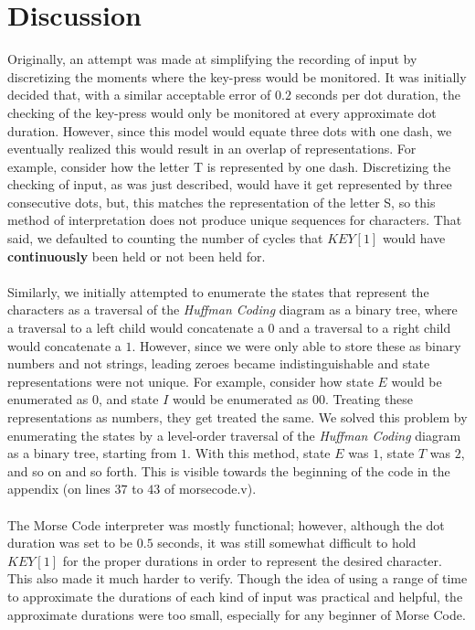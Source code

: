 \documentclass[12pt, letterpaper, english]{article}
\begin{document}
\section*{Discussion}
\indent\indent Originally, an attempt was made at simplifying the recording of input by discretizing the moments where the key-press would be monitored. It was initially decided that, with a similar acceptable error of $0.2$ seconds per dot duration, the checking of the key-press would only be monitored at every approximate dot duration. However, since this model would equate three dots with one dash, we eventually realized this would result in an overlap of representations. For example, consider how the letter T is represented by one dash. Discretizing  the checking of input, as was just described, would have it get represented by three consecutive dots, but, this matches the representation of the letter S, so this method of interpretation does not produce unique sequences for characters. That said, we defaulted to counting the number of cycles that $KEY[1]$ would have \textbf{continuously} been held or not been held for. \\\\
\indent Similarly, we initially attempted to enumerate the states that represent the characters as a traversal of the \textit{Huffman Coding} diagram as a binary tree, where a traversal to a left child would concatenate a $0$ and a traversal to a right child would concatenate a $1$. However, since we were only able to store these as binary numbers and not strings, leading zeroes became indistinguishable and state representations were not unique. For example, consider how state $E$ would be enumerated as $0$, and state $I$ would be enumerated as $00$. Treating these representations as numbers, they get treated the same. We solved this problem by enumerating the states by a level-order traversal of the \textit{Huffman Coding} diagram as a binary tree, starting from $1$. With this method, state $E$ was $1$, state $T$ was $2$, and so on and so forth. This is visible towards the beginning of the code in the appendix (on lines $37$ to $43$ of morsecode.v).\\\\
\indent The Morse Code interpreter was mostly functional; however, although the dot duration was set to be $0.5$ seconds, it was still somewhat difficult to hold $KEY[1]$ for the proper durations in order to represent the desired character. This also made it much harder to verify. Though the idea of using a range of time to approximate the durations of each kind of input was practical and helpful, the approximate durations were too small, especially for any beginner of Morse Code.\\\\
\end{document}
